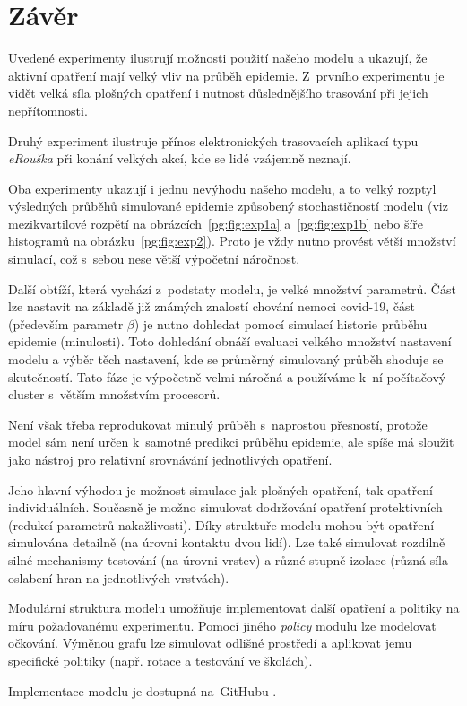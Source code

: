 \section*{Závěr}

Uvedené experimenty ilustrují možnosti použití našeho modelu a
ukazují, že aktivní opatření mají velký vliv na průběh epidemie.
Z~prvního experimentu je vidět velká síla plošných opatření i nutnost
důslednějšího trasování při jejich nepřítomnosti.

Druhý experiment ilustruje přínos elektronických trasovacích aplikací
typu {\em eRou\-ška} při konání velkých akcí, kde se lidé vzájemně
neznají.

Oba experimenty ukazují i jednu nevýhodu našeho modelu, a to velký rozptyl 
výsledných průběhů simulované epidemie způsobený stochastičností modelu (viz mezikvartilové rozpětí na
obrázcích~\ref{pg:fig:exp1a} a~\ref{pg:fig:exp1b} nebo šíře histogramů
na obrázku~\ref{pg:fig:exp2}). Proto je vždy nutno provést větší množství
simulací, což s~sebou nese větší výpočetní náročnost.

Další obtíží, která vychází z~podstaty modelu, je velké množství parametrů. Část lze nastavit na základě
již známých znalostí chování nemoci covid-19, část (především parametr $\beta$) je nutno dohledat pomocí simulací historie průběhu epidemie (minulosti). Toto dohledání obnáší evaluaci velkého množství nastavení modelu a výběr těch nastavení, kde se průměrný simulovaný průběh shoduje se skutečností. Tato fáze je výpočetně velmi náročná a používáme k~ní počítačový cluster s~větším množstvím procesorů. 

Není však třeba reprodukovat minulý průběh s~naprostou přesností, protože model sám není určen k~samotné predikci průběhu epidemie, ale spíše má sloužit jako nástroj pro relativní srovnávání jednotlivých opatření. 

Jeho hlavní výhodou je možnost simulace jak plošných o\-pat\-ře\-ní, tak
opatření individuálních. Současně je možno simulovat dodržování
opatření protektivních (redukcí parametrů nakažlivosti). Díky
struktuře modelu mohou být opatření simulována detailně (na úrovni
kontaktu dvou lidí). Lze také simulovat rozdílně silné mechanismy testování
(na úrovni vrstev) a různé stupně izolace (různá síla oslabení hran
na jednotlivých vrstvách).


Modulární struktura modelu umožňuje implementovat další opatření a
politiky na míru požadovanému experimentu. Pomocí jiného {\em policy}
modulu lze modelovat očkování. Výměnou grafu lze simulovat odlišné
prostředí a aplikovat jemu specifické politiky (např. rotace a testování
ve školách).


Implementace modelu je dostupná na~GitHubu \cite{pg:mmsoft}.


